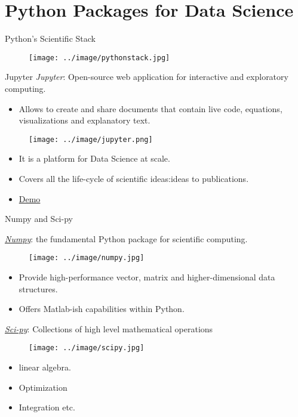 \documentclass{bredelebeamer}
\begin{document}
\section{Python Packages for Data Science}
\begin{frame}{Python’s Scientific Stack}
\begin{figure}[h]
		\texttt{[image: ../image/pythonstack.jpg]}
\end{figure}
\end{frame}
\begin{frame}{Jupyter}
\emph{Jupyter}: Open-source web application for interactive and exploratory computing.
\begin{itemize}
\item Allows to create and share documents that contain live code, equations, visualizations and explanatory text.
\end{itemize}
\begin{multicols}{2}
\begin{figure}[h]
		\texttt{[image: ../image/jupyter.png]}
		\label{fig:result1}
\end{figure}
\begin{itemize}
	\item It is a platform for Data Science at scale.
	\item Covers all the life-cycle of scientific ideas:ideas to publications.
	\item \href{https://try.jupyter.org/}{Demo}
\end{itemize}

\end{multicols}	
\end{frame}	


\begin{frame}{Numpy and Sci-py}
\begin{multicols}{2}
\href{http://www.numpy.org/}{\emph{Numpy}}: the fundamental Python package for scientific computing.
\begin{figure}[h]
		\texttt{[image: ../image/numpy.jpg]}
		\label{fig:result1}
\end{figure}

\begin{itemize}
	\item Provide high-performance vector, matrix and higher-dimensional data structures.
	\item Offers Matlab-ish capabilities within Python.
\end{itemize}
\href{https://www.scipy.org/}{\emph{Sci-py}}: Collections of high level mathematical operations
\begin{figure}[h]
		\texttt{[image: ../image/scipy.jpg]}
		\label{fig:result1}
\end{figure}
\begin{itemize}
	\item linear algebra.
	\item Optimization
	\item Integration etc.
\end{itemize}
\end{multicols}	
\end{frame}	
\end{document}
